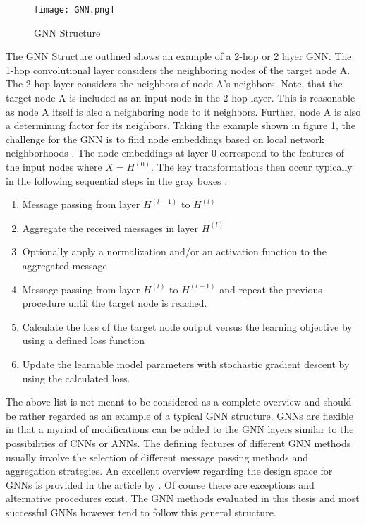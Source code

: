	\begin{figure}
		\centering
		\texttt{[image: GNN.png]}
		\caption{GNN Structure}
		\cite{leskovec2021lecture}
		\label{fig:GNN_structure}
	\end{figure}


	\noindent The GNN Structure outlined shows an example of a 2-hop or 2 layer GNN. 
	The 1-hop convolutional layer considers the neighboring nodes of the target node A. 
	The 2-hop layer considers the neighbors of node A's neighbors. Note, that the 
	target node A is included as an input node in the 2-hop layer. This is reasonable 
	as node A itself is also a neighboring node to it neighbors. Further, node 
	A is also a determining factor for its neighbors. Taking the example shown in
	figure \ref{fig:GNN_structure}, the challenge for the GNN is to find node
	embeddings based on local network neighborhoods
	\citep{leskovec2021lecture}. The node embeddings at layer 0 correspond to
	the features of the input nodes where $X = H^{(0)}$. The key transformations 
	then occur typically in the following sequential steps in the gray boxes
	\citep{you2020design}. 

	\begin{enumerate}
		\item Message passing from layer $H^{(l-1)}$ to $H^{(l)}$
		\item Aggregate the received messages in layer $H^{(l)}$
		\item Optionally apply a normalization and/or an activation function to
			the aggregated message
		\item Message passing from layer $H^{(l)}$ to $H^{(l+1)}$ and repeat the
			previous procedure until the target node is reached.
		\item Calculate the loss of the target node output versus the learning
			objective by using a defined loss function
		\item Update the learnable model parameters with stochastic gradient
			descent by using the calculated loss.
	\end{enumerate}

	\noindent The above list is not meant to be considered as a complete overview
	and should be rather regarded as an example of a typical GNN structure.
	GNNs are flexible in that a myriad of modifications can be added to the GNN
	layers similar to the possibilities of CNNs or ANNs. The defining features of
	different GNN methods usually involve the selection of different message
	passing methods and aggregation strategies. An excellent overview regarding 
	the design space for GNNs is provided in the article by \cite{you2020design}.
	Of course there are exceptions and alternative procedures exist. The GNN 
	methods evaluated in this thesis and most successful GNNs however tend to 
	follow this general structure.  \\

